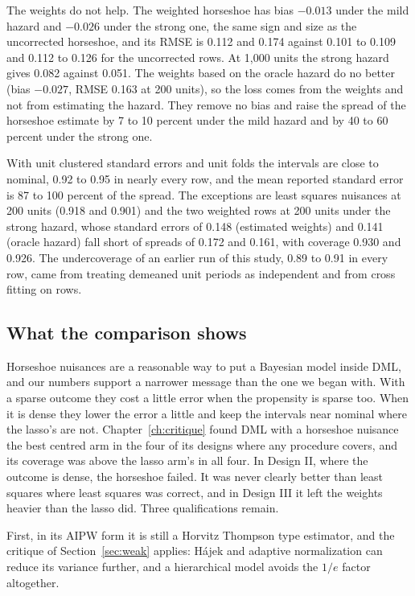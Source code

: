 The weights do not help. The weighted horseshoe has bias $-0.013$ under the mild hazard and $-0.026$ under the strong one, the same sign and size as the uncorrected horseshoe, and its RMSE is 0.112 and 0.174 against 0.101 to 0.109 and 0.112 to 0.126 for the uncorrected rows. At 1,000 units the strong hazard gives 0.082 against 0.051. The weights based on the oracle hazard do no better (bias $-0.027$, RMSE 0.163 at 200 units), so the loss comes from the weights and not from estimating the hazard. They remove no bias and raise the spread of the horseshoe estimate by 7 to 10 percent under the mild hazard and by 40 to 60 percent under the strong one.

With unit clustered standard errors and unit folds the intervals are close to nominal, 0.92 to 0.95 in nearly every row, and the mean reported standard error is 87 to 100 percent of the spread. The exceptions are least squares nuisances at 200 units (0.918 and 0.901) and the two weighted rows at 200 units under the strong hazard, whose standard errors of 0.148 (estimated weights) and 0.141 (oracle hazard) fall short of spreads of 0.172 and 0.161, with coverage 0.930 and 0.926. The undercoverage of an earlier run of this study, 0.89 to 0.91 in every row, came from treating demeaned unit periods as independent and from cross fitting on rows.



\subsection{What the comparison shows}

Horseshoe nuisances are a reasonable way to put a Bayesian model inside DML, and our numbers support a narrower message than the one we began with. With a sparse outcome they cost a little error when the propensity is sparse too. When it is dense they lower the error a little and keep the intervals near nominal where the lasso's are not. Chapter~\ref{ch:critique} found DML with a horseshoe nuisance the best centred arm in the four of its designs where any procedure covers, and its coverage was above the lasso arm's in all four. In Design II, where the outcome is dense, the horseshoe failed. It was never clearly better than least squares where least squares was correct, and in Design III it left the weights heavier than the lasso did. Three qualifications remain.

First, in its AIPW form it is still a Horvitz Thompson type estimator, and the critique of Section~\ref{sec:weak} applies: H\'ajek and adaptive normalization can reduce its variance further, and a hierarchical model avoids the $1/e$ factor altogether.

